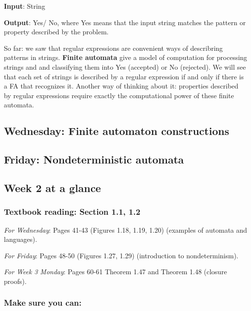 {\bf Input}: String

{\bf Output}: Yes/ No, where Yes means that the input string matches the pattern or property described by the problem.

So far: we saw that regular expressions are convenient ways of describring patterns in strings.
{\bf Finite automata} give a model of computation for processing strings and and classifying them into Yes (accepted)
or No (rejected). We will see that each set of strings is described by a regular expression if and only 
if there is a FA that recognizes it.  Another way of thinking about it: properties described by regular
expressions require exactly the computational power of these finite automata.


\subsection*{Wednesday: Finite automaton constructions}




\newpage
\subsection*{Friday: Nondeterministic automata}





\newpage
\subsection*{Week 2 at a glance}

\subsubsection*{Textbook reading: Section 1.1, 1.2}

{\it For Wednesday}: Pages 41-43 (Figures 1.18, 1.19, 1.20) (examples of automata and languages).

{\it For Friday}: Pages 48-50 (Figures 1.27, 1.29) (introduction to nondeterminism).

{\it For Week 3 Monday}: Pages 60-61 Theorem 1.47 and Theorem 1.48 (closure proofs).


\subsubsection*{Make sure you can:}

